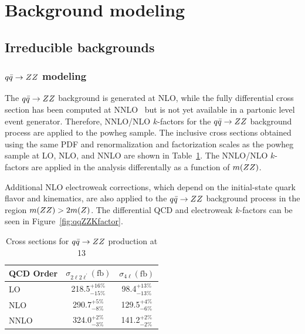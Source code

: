 \section{Background modeling}

\subsection{Irreducible backgrounds}
\label{sec:irrbkgd}

\subsubsection{$q\bar{q}\to ZZ$ modeling}
\label{sec:redbkgd}

The $q\bar{q}\to ZZ$ background is generated at NLO, while the fully differential cross section has been computed at 
NNLO~\cite{Grazzini2015407} but is not yet available in a partonic level event generator. Therefore, NNLO/NLO 
$k$-factors for the $q\bar{q}\to ZZ$ background process are applied to the {\sc powheg} sample. The inclusive cross 
sections obtained using the same PDF and renormalization and factorization scales as the {\sc powheg} sample
at LO, NLO, and NNLO are shown in Table~\ref{tab:qqZZXS}. The NNLO/NLO $k$-factors are applied in the analysis
differentally as a function of $m(ZZ)$. 

Additional NLO electroweak corrections, which depend on the initial-state quark flavor and kinematics,
are also applied to the $q\bar{q}\to ZZ$ background process in the region $m(Z Z)>2m(Z)$. The differential QCD and electroweak $k$-factors can be seen in 
Figure~\ref{fig:qqZZKfactor}.

\begin{table}[h]
    \centering
    \begin{tabular}{|l|c|c|} 
\hline %
QCD Order  & $\sigma_{2\ell2\ell^{\prime}} (\mathrm{fb})$  & $\sigma_{4\ell} (\mathrm{fb})$  \\
\hline %
LO    & 218.5$^{+16\%}_{-15\%}$ & 98.4$^{+13\%}_{-13\%}$ \\
NLO   & 290.7$^{+5\%}_{-8\%}$   & 129.5$^{+4\%}_{-6\%}$ \\
NNLO  & 324.0$^{+2\%}_{-3\%}$   & 141.2$^{+2\%}_{-2\%}$ \\
\hline %
    \end{tabular}
    \caption{Cross sections for $q\bar{q}\to ZZ$ production at 13 \TeV}
    \label{tab:qqZZXS}
\end{table}

